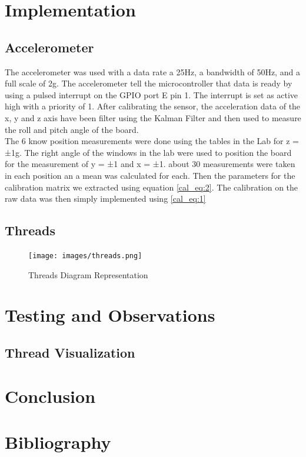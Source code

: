 \documentclass[12pt]{article}
\begin{document}
\section{Implementation}
\subsection{Accelerometer}
The accelerometer was used with a data rate a 25Hz, a bandwidth of 50Hz, and a full scale of 2g. The accelerometer tell the microcontroller that data is ready by using a pulsed interrupt on the GPIO port E pin 1. The interrupt is set as active high with a priority of 1. After calibrating the sensor, the acceleration data of the x, y and z axis have been filter using the Kalman Filter and then used to measure the roll and pitch angle of the board. \\

The 6 know position measurements were done using the tables in the Lab for z = ±1g. The right angle of the windows in the lab were used to position the board for the measurement of y = ±1 and x = ±1. about 30 measurements were taken in each position an a mean was calculated for each. Then the parameters for the calibration matrix we extracted using equation \ref{cal_eq:2}. The calibration on the raw data was then simply implemented using \ref{cal_eq:1}

\subsection{Threads}

\begin{figure}[!htb]
 \centering
 \texttt{[image: images/threads.png]}
 \caption{Threads Diagram Representation}
 \label{fig:threads}
\end{figure}


\section{Testing and Observations}
\subsection{Thread Visualization}
\subsection{}



\section{Conclusion}

\newpage
\section{Bibliography}

 
\end{document}

